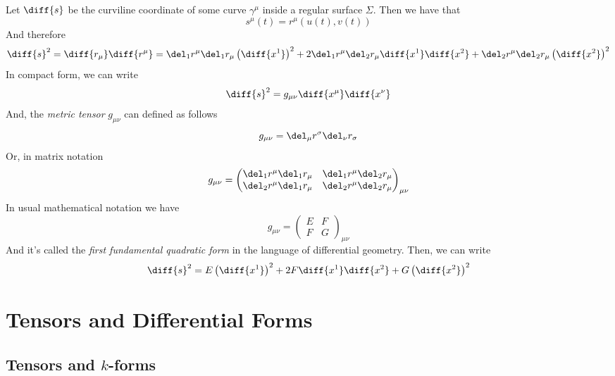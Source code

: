 \documentclass[../mmf.tex]{subfiles}
\begin{document}
\begin{dfn}
	Let $\diff{s}$ be the curviline coordinate of some curve $\gamma^\mu$ inside a regular surface $\Sigma$. Then we have that
	\begin{equation}
		s^\mu(t)=r^\mu(u(t),v(t))
		\label{eq:softsurf}
	\end{equation}
	And therefore
	\begin{equation}
		\diff{s}^2=\diff{r_\mu}\diff{r^\mu}=\del_1r^\mu\del_1r_\mu\left(\diff{x^1}\right)^2+2\del_1r^\mu\del_2r_\mu\diff{x^1}\diff{x^2}+\del_2r^\mu\del_2r_\mu\left( \diff{x^2} \right)^2
		\label{eq:diffssurf}
	\end{equation}
	In compact form, we can write
	\begin{equation}
		\diff{s}^2=g_{\mu\nu}\diff{x^\mu}\diff{x^\nu}
		\label{eq:metrictensorphys}
	\end{equation}
	And, the \textit{metric tensor} $g_{\mu\nu}$ can defined as follows
	\begin{equation}
		g_{\mu\nu}=\del_\mu r^\sigma\del_\nu r_\sigma
		\label{eq:metrictensor}
	\end{equation}
	Or, in matrix notation
	\begin{equation}
		g_{\mu\nu}=\begin{pmatrix}\del_1r^\mu\del_1r_\mu&\del_1r^\mu\del_2r_\mu\\\del_2r^\mu\del_1r_\mu&\del_2r^\mu\del_2r_\mu\end{pmatrix}_{\mu\nu}
		\label{eq:delmetrictensor}
	\end{equation}
	In usual mathematical notation we have
	\begin{equation}
		g_{\mu\nu}=\begin{pmatrix}E&F\\F&G\end{pmatrix}_{\mu\nu}
		\label{eq:metrictensro}
	\end{equation}
	And it's called the \textit{first fundamental quadratic form} in the language of differential geometry. Then, we can write
	\begin{equation}
		\diff{s}^2=E\left(\diff{x^1}\right)^2+2F\diff{x^1}\diff{x^2}+G\left(\diff{x^2}\right)^2
		\label{eq:diffsfff}
	\end{equation}
\end{dfn}
\section{Tensors and Differential Forms}
\subsection{Tensors and $k$-forms}
\end{document}

